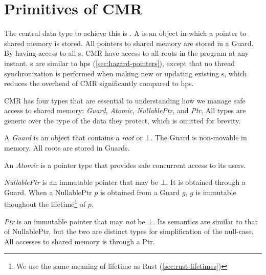 
\section{Primitives of CMR\label{sec:cmr-primitives}}

The central data type to achieve this is . A  is an object in which a
pointer to shared memory is stored. All pointers to shared memory are stored in a Guard. By having
access to all s, CMR have access to all roots in the program at any instant.
s are similar to \gls{hps} (\cref{sec:hazard-pointers}), except that no thread
synchronization is performed when making new or updating existing s, which reduces the
overhead of CMR significantly compared to \gls{hps}.

CMR has four types that are essential to understanding how we manage safe access to shared memory:
\emph{Guard}, \emph{Atomic}, \emph{NullablePtr}, and \emph{Ptr}. All types are generic over the
type of the data they protect, which is omitted for brevity.


\begin{definition}
  A \emph{Guard} is an object that contains a \emph{root} or $\bot$. The Guard is non-movable in
  memory. All roots are stored in Guards.
\end{definition}

\begin{definition}[Atomic]
  An \emph{Atomic} is a pointer type that provides safe concurrent access to its users.
\end{definition}

\begin{definition}[NullablePtr]
  \emph{NullablePtr} is an immutable pointer that may be $\bot$. It is obtained through a Guard.
  When a NullablePtr $p$ is obtained from a Guard $g$, $g$ is immutable thoughout the
  lifetime\footnote{We use the same meaning of lifetime as Rust (\cref{sec:rust-lifetimes})}
  of $p$.
\end{definition}

\begin{definition}[Ptr]
  \emph{Ptr} is an immutable pointer that may \emph{not} be $\bot$. Its semantics are similar to
  that of NullablePtr, but the two are distinct types for simplification of the null-case. All
  accesses to shared memory is through a Ptr.
\end{definition}

